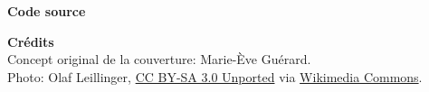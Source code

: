 \begin{frame}[t,plain,fragile=singleslide]
\begin{adjustwidth}{10mm}{10mm}
    \textbf{Code source} \\
    \viewsource{\ghurl}

    \textbf{Crédits} \\
    Concept original de la couverture: Marie-Ève Guérard. \\
    Photo: Olaf Leillinger,
    \href{https://creativecommons.org/licenses/by-sa/3.0/deed.en}{CC
      BY-SA 3.0 Unported} via
    \href{https://commons.wikimedia.org/wiki/File:Suricata.suricatta.6861.jpg}{%
      Wikimedia Commons}. \\
  \end{adjustwidth}
\end{frame}

